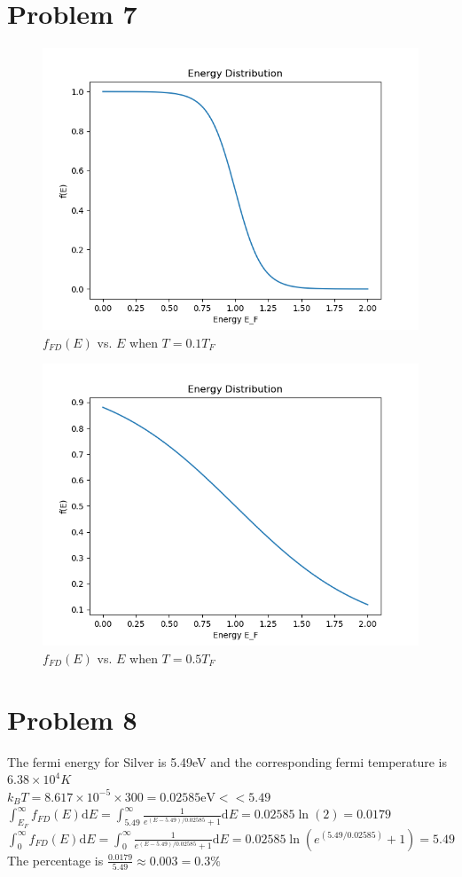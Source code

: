 \documentclass[a4paper]{article}
\begin{document}
\section{Problem 7}
\begin{figure}[H]
    \centering
    \includegraphics[scale=0.4]{P1.png}
    \caption{$f_{FD}(E)$ vs. $E$ when $T=0.1T_F$}
\end{figure}
\begin{figure}[H]
    \centering
    \includegraphics[scale=0.4]{P2.png}
    \caption{$f_{FD}(E)$ vs. $E$ when $T=0.5T_F$}
\end{figure}
\section{Problem 8}
\noindent
The fermi energy for Silver is 5.49eV and the corresponding fermi temperature is $6.38\times10^4K$
\\$k_BT=8.617\times10^{-5}\times300=0.02585\text{eV}<<5.49$
\\$\int_{E_F}^\infty f_{FD}(E)\mathrm{d}E=\int_{5.49}^\infty\frac{1}{e^{(E-5.49)/0.02585}+1}\mathrm{d}E=0.02585\ln(2)=0.0179$
\\$\int_{0}^\infty f_{FD}(E)\mathrm{d}E=\int_{0}^\infty\frac{1}{e^{(E-5.49)/0.02585}+1}\mathrm{d}E=0.02585\ln(e^{(5.49/0.02585)}+1)=5.49$
\\The percentage is $\frac{0.0179}{5.49}\approx0.003=0.3\%$
\end{document}
